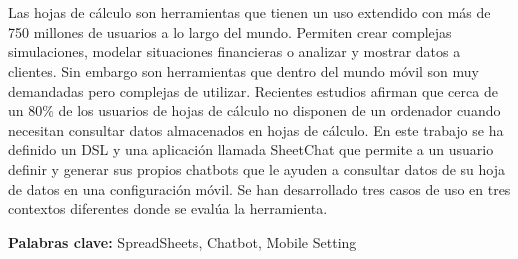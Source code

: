 \chapter*{\abstract}
\setcounter{page}{1}

Las hojas de cálculo son herramientas que tienen un uso extendido con más de 750 millones de usuarios a lo largo del mundo. Permiten crear complejas simulaciones, modelar situaciones financieras o analizar y mostrar datos a clientes. Sin embargo son herramientas que dentro del mundo móvil son muy demandadas pero complejas de utilizar. Recientes estudios afirman que cerca de un 80\% de los usuarios de hojas de cálculo no disponen de un ordenador cuando necesitan consultar datos almacenados en hojas de cálculo. En este trabajo se ha definido un DSL y una aplicación llamada SheetChat que permite a un usuario definir y generar sus propios chatbots que le ayuden a consultar datos de su hoja de datos en una configuración móvil. Se han desarrollado tres casos de uso en tres contextos diferentes donde se evalúa la herramienta.


\textbf{Palabras clave:} SpreadSheets, Chatbot, Mobile Setting


